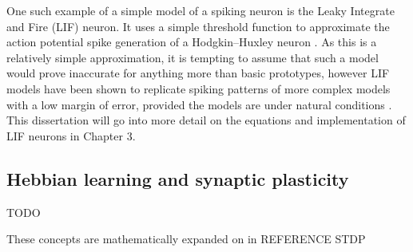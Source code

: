 One such example of a simple model of a spiking neuron is the Leaky Integrate
and Fire (LIF) neuron. It uses a simple threshold function to approximate the
action potential spike generation of a Hodgkin–Huxley neuron
\autocite{trappenberg_fundamentals_2009}. As this is a relatively simple
approximation, it is tempting to assume that such a model would prove inaccurate
for anything more than basic prototypes, however LIF models have been shown to
replicate spiking patterns of more complex models with a low margin of error,
provided the models are under natural conditions
\autocite{teeter_generalized_2018}. This dissertation will go into more detail on
the equations and implementation of LIF neurons in Chapter 3. %

\subsection{Hebbian learning and synaptic plasticity}

TODO

These concepts are mathematically expanded on in REFERENCE STDP